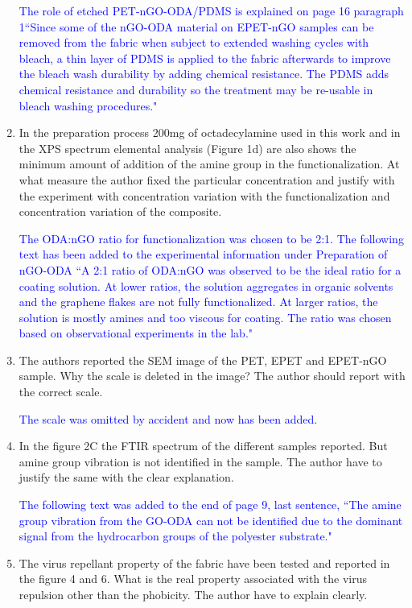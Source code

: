 \documentclass[12pt]{letter}
\newcommand{\blue}[1]{\textcolor{blue}{#1}} %
\begin{document}
\begin{enumerate}
\blue{The role of etched PET-nGO-ODA/PDMS is explained on page 16 paragraph 1``Since some of the nGO-ODA material on EPET-nGO samples can be removed from the fabric when subject to extended washing cycles with bleach, a thin layer of PDMS is applied to the fabric afterwards to improve the bleach wash durability by adding chemical resistance. The PDMS adds chemical resistance and durability so the treatment may be re-usable in bleach washing procedures."}


\item     In the preparation process 200mg of octadecylamine used in this work and in the XPS spectrum elemental analysis (Figure 1d) are also shows the minimum amount of addition of the amine group in the functionalization. At what measure the author fixed the particular concentration and justify with the experiment with concentration variation with the functionalization and concentration variation of the composite.

\blue{The ODA:nGO ratio for functionalization was chosen to be 2:1.  The following text has been added to the experimental information under Preparation of nGO-ODA ``A 2:1 ratio of ODA:nGO was observed to be the ideal ratio for a coating solution. At lower ratios, the solution aggregates in organic solvents and the graphene flakes are not fully functionalized. At larger ratios, the solution is mostly amines and too viscous for coating. The ratio was chosen based on observational experiments in the lab." }

\item     The authors reported the SEM image of the PET, EPET and EPET-nGO sample. Why the scale is deleted in the image? The author should report with the correct scale.

\blue{The scale was omitted by accident and now has been added.}

\item      In the figure 2C the FTIR spectrum of the different samples reported. But amine group vibration is not identified in the sample. The author have to justify the same with the clear explanation.

\blue{The following text was added to the end of page 9, last sentence, ``The amine group vibration from the GO-ODA can not be identified due to the dominant signal from the hydrocarbon groups of the polyester substrate."}

\item      The virus repellant property of the fabric have been tested and reported in the figure 4 and 6. What is the real property associated with the virus repulsion other than the phobicity. The author have to explain clearly.


\end{enumerate}
\end{document}
